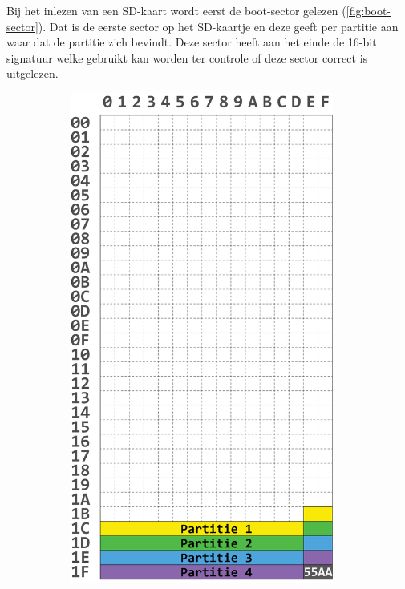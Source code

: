 
Bij het inlezen van een SD-kaart wordt eerst de boot-sector gelezen (\cref{fig:boot-sector}). Dat is de eerste sector op het SD-kaartje en deze geeft per partitie aan waar dat de partitie zich bevindt. Deze sector heeft aan het einde de 16-bit signatuur  welke gebruikt kan worden ter controle of deze sector correct is uitgelezen.

\begin{figure}[h!]
    \begin{subfigure}[t]{0.3\textwidth}
        \centering
        \includegraphics[width=0.95\textwidth]{img/boot-sector.png}

\end{subfigure}
\end{figure}
